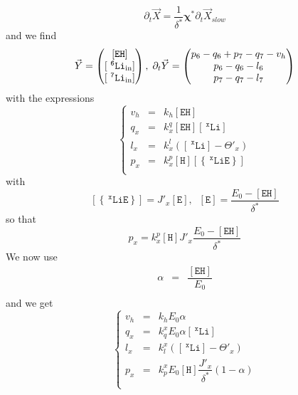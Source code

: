 \documentclass[aps,onecolumn,12pt]{revtex4}
\newcommand{\mychem}[1]{\mathtt{#1}}
\newcommand{\myconc}[1]{\left\lbrack{#1}\right\rbrack}
\newcommand{\spLi}[1]{{~^{\mychem{#1}}\mychem{Li}}}
\newcommand{\Li}[1]{\myconc{\spLi{#1}}}
\newcommand{\spEout}{\mychem{E}}
\newcommand{\Eout}{\myconc{\spEout}}
\newcommand{\spLiE}[1]{\left\lbrace\spLi{#1}\spEout\right\rbrace}
\newcommand{\LiE}[1]{\myconc{\spLiE{#1}}}
\newcommand{\spLiIn}[1]{{\spLi{#1}}_{\mathrm{in}}}
\newcommand{\LiIn}[1]{\myconc{\spLiIn{#1}}}
\newcommand{\spEHin}{\mychem{EH}}
\newcommand{\EHin}{\myconc{\spEHin}}
\newcommand{\spproton}{\mychem{H}}
\newcommand{\proton}{\myconc{\spproton}}
\newcommand{\mymat}[1]{{\bm{#1}}}
\begin{document}
\begin{equation}
	\partial_t\vec{X} = \dfrac{1}{\delta^\ast}
	\mymat{\chi}^\ast \partial_t\vec{X}_{slow}
\end{equation}
and we find
\begin{equation}
	\vec{Y} = \begin{pmatrix} \EHin \cr \LiIn{6} \cr \LiIn{7} \end{pmatrix}
	,\;\partial_t \vec{Y} = 
	\begin{pmatrix}
	p_6-q_6+p_7-q_7-v_h\\
	p_6-q_6-l_6\\
	p_7-q_7-l_7
	\end{pmatrix}
\end{equation}
with the expressions
\begin{equation}
\left\lbrace
	\begin{array}{rcl}
	v_h & = & k_h \EHin \\
	q_x & = & k_x^q \EHin \Li{x}  \\
	l_x & = & k_x^l \left(\Li{x}-\Theta'_x\right)\\
	p_x & = & k_x^p \proton \LiE{x}\\
	\end{array}
\right.
\end{equation}
with
\begin{equation}
	\LiE{x} = J'_x \Eout,\;\;\Eout=\dfrac{E_0-\EHin}{\delta^\ast}
\end{equation}
so that
\begin{equation}
	p_x = k_x^p \proton  J'_x \dfrac{E_0-\EHin}{\delta^\ast}
\end{equation}
We now use
\begin{equation}
	\begin{array}{rcl}
	\alpha    & = &\dfrac{\EHin}{E_0}\\
	\end{array}
\end{equation}
and we get
\begin{equation}
	\left\lbrace
	\begin{array}{rcl}
	v_h & = & k_h E_0 \alpha \\
	q_x & = & k_q^x E_0 \alpha \Li{x}  \\
	l_x & = & k_l^x \left(\Li{x} -\Theta'_x\right)\\
	p_x & = & k_p^x E_0 \proton \dfrac{J'_x}{\delta^\ast}(1-\alpha) \\
	\end{array}
\right.
\end{equation}
\end{document}
